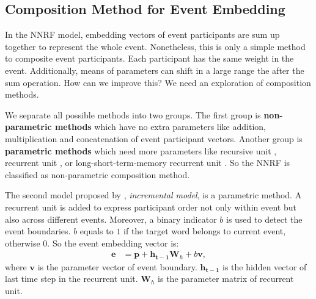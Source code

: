 \documentclass[a4paper]{article}
\begin{document}
\subsection{Composition Method for Event Embedding} \label{sec:composition}
In the NNRF model, embedding vectors of event participants are sum up together to represent the whole event. Nonetheless, this is only a simple method to composite event participants. Each participant has the same weight in the event. Additionally, means of parameters can shift in a large range the after the sum operation. How can we improve this? We need an exploration of composition methods. 

We separate all possible methods into two groups. The first group is \textbf{non-parametric methods} which have no extra parameters like addition, multiplication and concatenation of event participant vectors. Another group is \textbf{parametric methods} which need more parameters like recursive unit \citep{socher2013recursive}, recurrent unit \citet{mikolov2010recurrent}, or long-short-term-memory recurrent unit \citep{hochreiter1997LSTM}. So the NNRF is classified as non-parametric composition method. 

The second model proposed by \citet{tilk2016event}, \textit{incremental model}, is a parametric method. A recurrent unit is added to express participant order not only within event but also across different events. Moreover, a binary indicator $b$ is used to detect the event boundaries. $b$ equals to $1$ if the target word belongs to current event, otherwise $0$. So the event embedding vector is: 
\begin{equation} \label{eq:incremental}
\begin{aligned}
    \mathbf{e} 
        &= \mathbf{p} + \mathbf{h_{t-1}}\mathbf{W}_h + b\mathbf{v}, 
\end{aligned}
\end{equation}
where $\mathbf{v}$ is the parameter vector of event boundary. $\mathbf{h_{t-1}}$ is the hidden vector of last time step in the recurrent unit. $\mathbf{W}_h$ is the parameter matrix of recurrent unit. 
\end{document}
